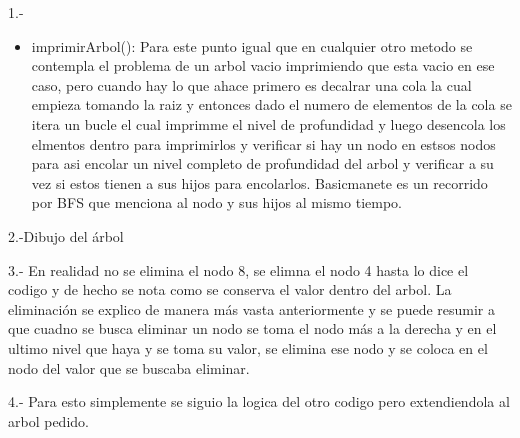 \begin{respuesta}{1.-}
\begin{itemize}
\begin{enumerate}
        \end{enumerate}
        \item imprimirArbol():
        Para este punto igual que en cualquier otro metodo se contempla el problema de un arbol vacio imprimiendo que esta vacio en ese caso, pero cuando hay lo que ahace primero es decalrar una cola la cual empieza tomando la raiz y entonces dado el numero de elementos de la cola se itera un bucle el cual imprimme el nivel de profundidad y luego desencola los elmentos dentro para imprimirlos y verificar si hay un nodo en estsos nodos para asi encolar un nivel completo de profundidad del arbol y verificar a su vez si estos tienen a sus hijos para encolarlos. Basicmanete es un recorrido por BFS que menciona al nodo y sus hijos al mismo tiempo.
    \end{itemize}
\end{respuesta}
\begin{respuesta}{2.-Dibujo del árbol}
\end{respuesta}
\begin{respuesta}{3.-}
    En realidad no se elimina el nodo 8, se elimna el nodo 4 hasta lo dice el codigo y de hecho se nota como se conserva el valor dentro del arbol. La eliminación se explico de manera más vasta anteriormente y se puede resumir a que cuadno se busca eliminar un nodo se toma el nodo más a la derecha y en el ultimo nivel que haya y se toma su valor, se elimina ese nodo y se coloca en el nodo del valor que se buscaba eliminar.
\end{respuesta}
\begin{respuesta}{4.-}
    Para esto simplemente se siguio la logica del otro codigo pero extendiendola al arbol pedido.
\end{respuesta}
